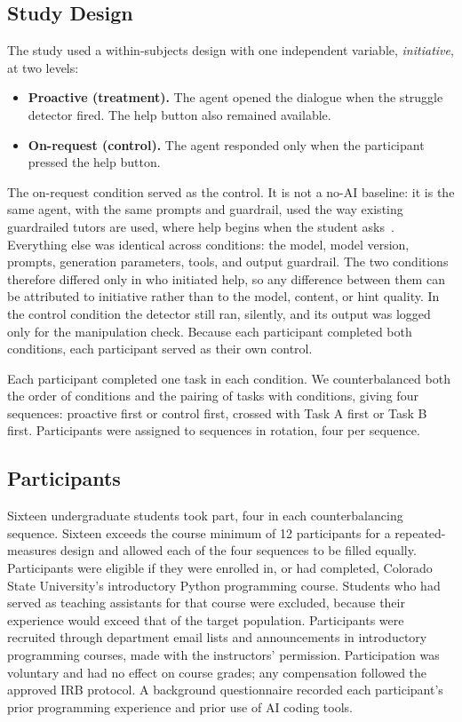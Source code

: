 \documentclass[manuscript,review]{acmart}
\begin{document}
\subsection{Study Design}
\label{sec:design}
The study used a within-subjects design with one independent variable, \emph{initiative}, at two levels:
\begin{itemize}
  \item \textbf{Proactive (treatment).} The agent opened the dialogue when the struggle detector fired. The help button also remained available.
  \item \textbf{On-request (control).} The agent responded only when the participant pressed the help button.
\end{itemize}
The on-request condition served as the control. It is not a no-AI baseline: it is the same agent, with the same prompts and guardrail, used the way existing guardrailed tutors are used, where help begins when the student asks~\cite{liffiton2023codehelp,deoraj2025guiding}. Everything else was identical across conditions: the model, model version, prompts, generation parameters, tools, and output guardrail. The two conditions therefore differed only in who initiated help, so any difference between them can be attributed to initiative rather than to the model, content, or hint quality. In the control condition the detector still ran, silently, and its output was logged only for the manipulation check. Because each participant completed both conditions, each participant served as their own control.

Each participant completed one task in each condition. We counterbalanced both the order of conditions and the pairing of tasks with conditions, giving four sequences: proactive first or control first, crossed with Task A first or Task B first. Participants were assigned to sequences in rotation, four per sequence.

\subsection{Participants}
Sixteen undergraduate students took part, four in each counterbalancing sequence. Sixteen exceeds the course minimum of 12 participants for a repeated-measures design and allowed each of the four sequences to be filled equally. Participants were eligible if they were enrolled in, or had completed, Colorado State University's introductory Python programming course. Students who had served as teaching assistants for that course were excluded, because their experience would exceed that of the target population. Participants were recruited through department email lists and announcements in introductory programming courses, made with the instructors' permission. Participation was voluntary and had no effect on course grades; any compensation followed the approved IRB protocol. A background questionnaire recorded each participant's prior programming experience and prior use of AI coding tools.
\end{document}
